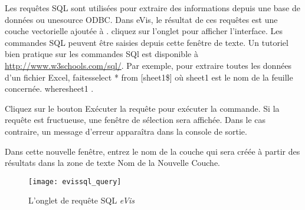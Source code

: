 \label{evis_running_sql}


Les requêtes SQL sont utilisées pour extraire des informations depuis une base de données ou unesource ODBC. Dans eVis, le résultat de ces requêtes est une couche vectorielle ajoutée à \qg. cliquez sur l'onglet  pour afficher l'interface. Les commandes SQL peuvent être saisies depuis cette fenêtre de texte. Un tutoriel bien pratique sur les commandes SQl est disponible à \url{http://www.w3schools.com/sql/}. Par exemple, pour extraire toutes les données d'un fichier Excel, faitesselect * from [sheet1\$]  où sheet1  est le nom de la feuille concernée.
wheresheet1 .


Cliquez sur le bouton Exécuter la requête pour exécuter la commande. Si la requête est fructueuse, une fenêtre de sélection sera affichée. Dans le cas contraire, un message d'erreur apparaîtra dans la console de sortie.


Dans cette nouvelle fenêtre, entrez le nom de la couche qui sera créée à partir des résultats dans la zone de texte Nom de la Nouvelle Couche.

\begin{figure}[ht]
   \begin{center}
\texttt{[image: evissql\_query]}
\caption{L'onglet de requête SQL \emph{eVis} \nixcaption}\label{evissql_query}
\end{center}
\end{figure}

